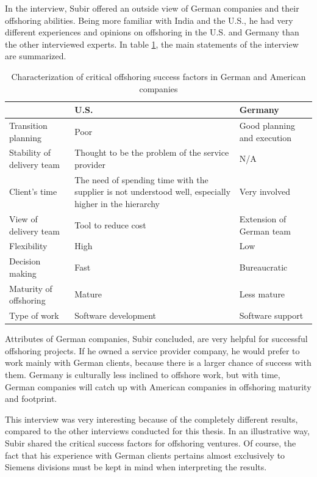 In the interview, Subir offered an outside view of German companies and their offshoring abilities. Being more familiar with India and the U.S., he had very different experiences and opinions on offshoring in the U.S. and Germany than the other interviewed experts. In table \ref{tab:SubirComparison}, the main statements of the interview are summarized.
\vspace{3mm}
\begin{table}[htb]
	\centering
	\begin{tabular}{l|p{5.1cm}|p{5.1cm}}
		& \textbf{U.S.} & \textbf{Germany}\\\hline
		\rule{0pt}{3ex}Transition planning&Poor& Good planning and execution\\ \hline
		\rule{0pt}{3ex}Stability of delivery team&Thought to be the problem of the service provider & N/A \\ \hline
		\rule{0pt}{3ex}Client's time &The need of spending time with the supplier is not understood well, especially higher in the hierarchy & Very involved \\ \hline
		\rule{0pt}{3ex}View of delivery team& Tool to reduce cost&Extension of German team \\ \hline
		\rule{0pt}{3ex}Flexibility&High &Low \\ \hline
		\rule{0pt}{3ex}Decision making &Fast &Bureaucratic \\ \hline
		\rule{0pt}{3ex}Maturity of offshoring &Mature & Less mature \\ \hline
		\rule{0pt}{3ex}Type of work & Software development & Software support\\ \hline
	\end{tabular}
	\vspace{3mm}
	\caption{Characterization of critical offshoring success factors in German and American companies}
	\label{tab:SubirComparison}
\end{table}

Attributes of German companies, Subir concluded, are very helpful for successful offshoring projects. If he owned a service provider company, he would prefer to work mainly with German clients, because there is a larger chance of success with them. Germany is culturally less inclined to offshore work, but with time, German companies will catch up with American companies in offshoring maturity and footprint.

This interview was very interesting because of the completely different results, compared to the other interviews conducted for this thesis. In an illustrative way, Subir shared the critical success factors for offshoring ventures. Of course, the fact that his experience with German clients pertains almost exclusively to Siemens divisions must be kept in mind when interpreting the results.

